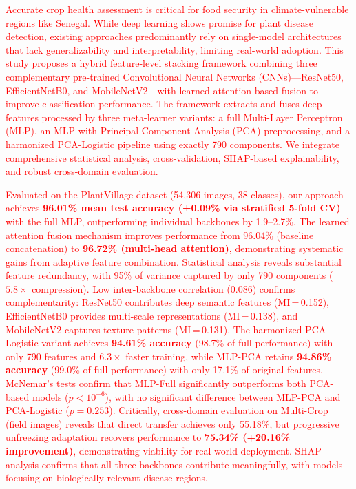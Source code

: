 {{%
%
%
\textcolor{red}{
Accurate crop health assessment is critical for food security in climate-vulnerable regions like Senegal. While deep learning shows promise for plant disease detection, existing approaches predominantly rely on single-model architectures that lack generalizability and interpretability, limiting real-world adoption. This study proposes a hybrid feature-level stacking framework combining three complementary pre-trained Convolutional Neural Networks (CNNs)—ResNet50, EfficientNetB0, and MobileNetV2—with learned attention-based fusion to improve classification performance. The framework extracts and fuses deep features processed by three meta-learner variants: a full Multi-Layer Perceptron (MLP), an MLP with Principal Component Analysis (PCA) preprocessing, and a harmonized PCA-Logistic pipeline using exactly 790 components. We integrate comprehensive statistical analysis, cross-validation, SHAP-based explainability, and robust cross-domain evaluation.

Evaluated on the PlantVillage dataset (54,306 images, 38 classes), our approach achieves \textbf{96.01\% mean test accuracy (±0.09\% via stratified 5-fold CV)} with the full MLP, outperforming individual backbones by 1.9--2.7\%. The learned attention fusion mechanism improves performance from 96.04\% (baseline concatenation) to \textbf{96.72\% (multi-head attention)}, demonstrating systematic gains from adaptive feature combination. Statistical analysis reveals substantial feature redundancy, with 95\% of variance captured by only 790 components ($5.8\times$ compression). Low inter-backbone correlation (0.086) confirms complementarity: ResNet50 contributes deep semantic features (MI\,=\,0.152), EfficientNetB0 provides multi-scale representations (MI\,=\,0.138), and MobileNetV2 captures texture patterns (MI\,=\,0.131). The harmonized PCA-Logistic variant achieves \textbf{94.61\% accuracy} (98.7\% of full performance) with only 790 features and $6.3\times$ faster training, while MLP-PCA retains \textbf{94.86\% accuracy} (99.0\% of full performance) with only 17.1\% of original features. McNemar's tests confirm that MLP-Full significantly outperforms both PCA-based models ($p < 10^{-6}$), with no significant difference between MLP-PCA and PCA-Logistic ($p = 0.253$). Critically, cross-domain evaluation on Multi-Crop (field images) reveals that direct transfer achieves only 55.18\%, but progressive unfreezing adaptation recovers performance to \textbf{75.34\% (+20.16\% improvement)}, demonstrating viability for real-world deployment. SHAP analysis confirms that all three backbones contribute meaningfully, with models focusing on biologically relevant disease regions.

}}}
